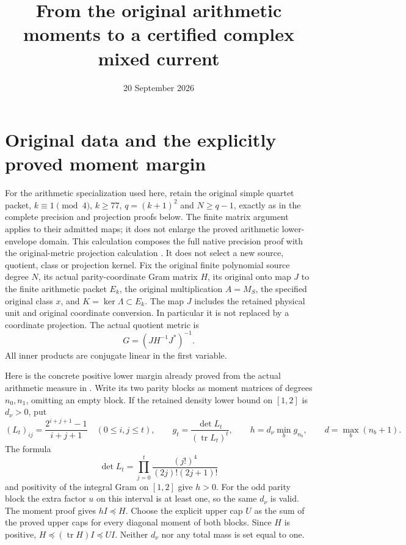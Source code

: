 \documentclass[11pt]{article}
\title{From the original arithmetic moments to a certified complex mixed current}
\author{}\date{20 September 2026}
\newcommand{\tr}{\operatorname{tr}}
\begin{document}
\maketitle

\section{Original data and the explicitly proved moment margin}
For the arithmetic specialization used here, retain the original simple
quartet packet, $k\equiv1\pmod4$, $k\ge77$, $q=(k+1)^2$ and
$N\ge q-1$, exactly as in the complete precision and projection
proofs below. The finite matrix argument applies to their admitted
maps; it does not enlarge the proved arithmetic lower-envelope domain.
This calculation composes the full native precision proof
\cite{precision} with the original-metric projection calculation
\cite{projection}. It does not select a new source, quotient, class or
projection kernel. Fix the original finite polynomial source degree $N$,
its actual parity-coordinate Gram matrix $H$, its original onto map
$J$ to the finite arithmetic packet $E_k$, the original multiplication
$A=M_S$, the specified original class $x$, and $K=\ker\Lambda\subset E_k$.
The map $J$ includes the retained physical unit and original coordinate
conversion. In particular it is not replaced by a coordinate projection.
The actual quotient metric is
\[
 G=(JH^{-1}J^*)^{-1}.                                      \tag{MC1}
\]
All inner products are conjugate linear in the first variable.

Here is the concrete positive lower margin already proved from the actual
arithmetic measure in \cite{precision}. Write its two parity blocks as
moment matrices of degrees $n_0,n_1$, omitting an empty block. If the
retained density lower bound on $[1,2]$ is $d_\nu>0$, put
\[
 (L_t)_{ij}=\frac{2^{i+j+1}-1}{i+j+1}\quad(0\le i,j\le t),
 \qquad g_t=\frac{\det L_t}{(\tr L_t)^t},\qquad
 h=d_\nu\min_{b}g_{n_b},\qquad d=\max_b(n_b+1).              \tag{MC2}
\]
The formula
\[
 \det L_t=\prod_{j=0}^t\frac{(j!)^4}{(2j)!(2j+1)!}
\]
and positivity of the integral Gram on $[1,2]$ give $h>0$.
For the odd parity block the extra factor $u$ on this interval is at
least one, so the same $d_\nu$ is valid. The moment proof gives
$hI\preceq H$. Choose the explicit upper cap $U$ as the sum of
the proved upper caps for every diagonal moment of both blocks. Since
$H$ is positive, $H\preceq(\tr H)I\preceq UI$.
Neither $d_\nu$ nor any total mass is set equal to one.
\end{document}
